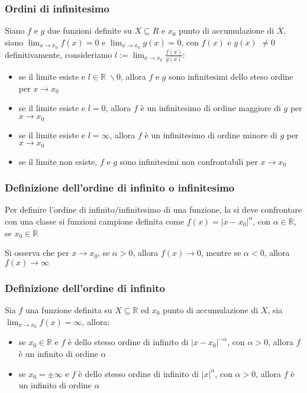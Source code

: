 \documentclass[a4paper]{article}
\begin{document}
\subsubsection*{Ordini di infinitesimo}
Siano \(f\) e \(g\) due funzioni definite su \(X \subseteq R\) e \(x_0\) punto di accumulazione di \(X\), siano \(\displaystyle \lim_{x \to x_0} f(x) = 0\)
e \(\displaystyle \lim_{x \to x_0} g(x) = 0\), con \(f(x)\) e \(g(x)\) \(\neq 0\) definitivamente, consideriamo \(\displaystyle l := \lim_{x \to x_0} \frac{f(x)}{g(x)}\):
\begin{itemize}
	\item se il limite esiste e \(l \in \mathbb{R} \; \backslash 0\), allora \(f\) e \(g\) sono infinitesimi dello steso ordine per \(x \to x_0\)
	\item se il limite esiste e \(l = 0\), allora \(f\) è un infinitesimo di ordine maggiore di \(g\) per \(x \to x_0\)
	\item se il limite esiste e \(l = \infty\), allora \(f\) è un infinitesimo di ordine minore di \(g\) per \(x \to x_0\)
	\item se il limite non esiste, \(f\) e \(g\) sono infinitesimi non confrontabili per \(x \to x_0\)
\end{itemize}

\subsubsection*{Definizione dell'ordine di infinito o infinitesimo}
Per definire l'ordine di infinito/infinitesimo di una funzione, la si deve confrontare con una classe si funzioni campione definita
come \(f(x) = \left| x - x_0 \right| ^ \alpha\), con \(\alpha \in \mathbb{R}\), se \(x_0 \in \mathbb{R}\)

Si osserva che per \(x \to x_0\), se \(\alpha > 0\), allora \(f(x) \to 0\), mentre se \(\alpha < 0\), allora \(f(x) \to \infty\)

\subsubsection*{Definizione dell'ordine di infinito}
Sia \(f\) una funzione definita su \(X \subseteq \mathbb{R}\) ed \(x_0\) punto di accumulazione di \(X\), sia \(\displaystyle \lim_{x \to x_0} f(x) = \infty\), allora:
\begin{itemize}
	\item se \(x_0 \in \mathbb{R}\) e \(f\) è dello stesso ordine di infinito di \(\left| x - x_0 \right| ^ {-\alpha}\), con \(\alpha > 0\),
	allora \(f\) è un infinito di ordine \(\alpha\)
	\item se \(x_0 = \pm \infty\) e \(f\) è dello stesso ordine di infinito di \(\left| x \right| ^ \alpha\), con \(\alpha > 0\),
	allora \(f\) è un infinito di ordine \(\alpha\)
\end{itemize}
\end{document}
